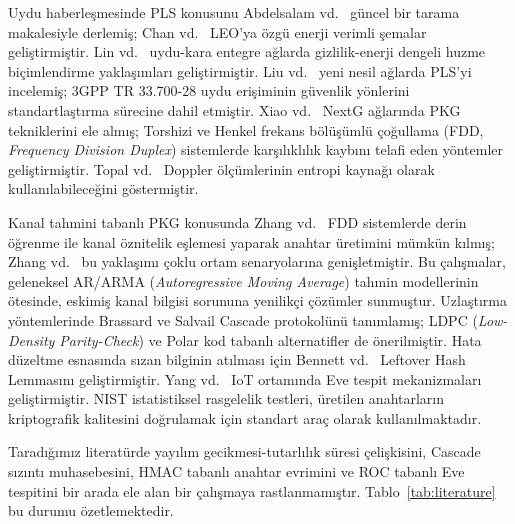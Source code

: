\documentclass[conference,a4paper]{IEEEtran}
\begin{document}
Uydu haberleşmesinde PLS konusunu Abdelsalam vd.\ \cite{abdelsalam_state} güncel bir tarama makalesiyle derlemiş; Chan vd.\ \cite{chan_energy} LEO'ya özgü enerji verimli şemalar geliştirmiştir. Lin vd.\ \cite{lin_leo} uydu-kara entegre ağlarda gizlilik-enerji dengeli huzme biçimlendirme yaklaşımları geliştirmiştir. Liu vd.\ \cite{liu_nextg} yeni nesil ağlarda PLS'yi incelemiş; 3GPP TR 33.700-28 \cite{3gpp} uydu erişiminin güvenlik yönlerini standartlaştırma sürecine dahil etmiştir. Xiao vd.\ \cite{xiao_nextg} NextG ağlarında PKG tekniklerini ele almış; Torshizi ve Henkel \cite{torshizi} frekans bölüşümlü çoğullama (FDD, \emph{Frequency Division Duplex}) sistemlerde karşılıklılık kaybını telafi eden yöntemler geliştirmiştir. Topal vd.\ \cite{topal_doppler} Doppler ölçümlerinin entropi kaynağı olarak kullanılabileceğini göstermiştir.

Kanal tahmini tabanlı PKG konusunda Zhang vd.\ \cite{zhang_fdd_dnn} FDD sistemlerde derin öğrenme ile kanal öznitelik eşlemesi yaparak anahtar üretimini mümkün kılmış; Zhang vd.\ \cite{zhang_fdd_ofdm} bu yaklaşımı çoklu ortam senaryolarına genişletmiştir. Bu çalışmalar, geleneksel AR/ARMA (\emph{Autoregressive Moving Average}) tahmin modellerinin ötesinde, eskimiş kanal bilgisi sorununa yenilikçi çözümler sunmuştur. Uzlaştırma yöntemlerinde Brassard ve Salvail \cite{cascade_orig} Cascade protokolünü tanımlamış; LDPC (\emph{Low-Density Parity-Check}) \cite{ldpc_recon} ve Polar kod \cite{polar_recon} tabanlı alternatifler de önerilmiştir. Hata düzeltme esnasında sızan bilginin atılması için Bennett vd.\ \cite{bennett_lhl} Leftover Hash Lemmasını geliştirmiştir. Yang vd.\ \cite{yang_iot} IoT ortamında Eve tespit mekanizmaları geliştirmiştir. NIST \cite{nist_sp800_22} istatistiksel rasgelelik testleri, üretilen anahtarların kriptografik kalitesini doğrulamak için standart araç olarak kullanılmaktadır.

Taradığımız literatürde yayılım gecikmesi-tutarlılık süresi çelişkisini, Cascade sızıntı muhasebesini, HMAC tabanlı anahtar evrimini ve ROC tabanlı Eve tespitini bir arada ele alan bir çalışmaya rastlanmamıştır. Tablo~\ref{tab:literature} bu durumu özetlemektedir.
\end{document}
